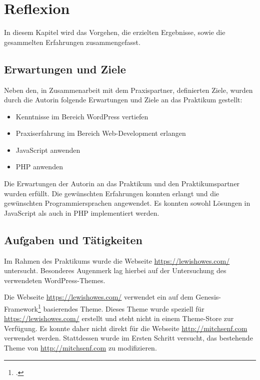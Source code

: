 
\chapter{Reflexion}

In diesem Kapitel wird das Vorgehen, die erzielten Ergebnisse, sowie die gesammelten Erfahrungen zusammengefasst.


\section{Erwartungen und Ziele}


Neben den, in Zusammenarbeit mit dem Praxispartner, definierten Ziele, wurden durch die Autorin folgende Erwartungen und Ziele an das Praktikum gestellt:

\begin{itemize}
	\item Kenntnisse im Bereich WordPress vertiefen
	\item Praxiserfahrung im Bereich Web-Development erlangen
	\item JavaScript anwenden
	\item PHP anwenden
\end{itemize}

Die Erwartungen der Autorin an das Praktikum und den Praktikumspartner wurden erfüllt. Die gewünschten Erfahrungen konnten erlangt und die gewünschten Programmiersprachen angewendet. Es konnten sowohl Lösungen in JavaScript als auch in PHP implementiert werden.


\section{Aufgaben und Tätigkeiten}


Im Rahmen des Praktikums wurde die Webseite \url{https://lewishowes.com/} untersucht. Besonderes Augenmerk lag hierbei auf der Untersuchung des verwendeten WordPress-Themes.

Die Webseite \url{https://lewishowes.com/} verwendet ein auf dem Genesis-Framework\footcite{genesis-theme} basierendes Theme. Dieses Theme wurde speziell für \url{https://lewishowes.com/} erstellt und steht nicht in einem Theme-Store zur Verfügung. Es konnte daher nicht direkt für die Webseite \url{http://mitchsenf.com} verwendet werden. Stattdessen wurde im Ersten Schritt versucht, das bestehende Theme von \url{http://mitchsenf.com} zu modifizieren.

